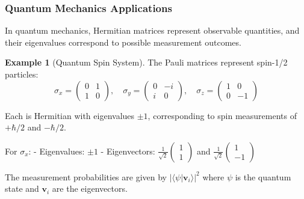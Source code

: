 \documentclass[12pt]{article}
\numberwithin{equation}{section}
\newcommand{\vect}[1]{\boldsymbol{#1}}   %
\theoremstyle{plain}
\theoremstyle{definition}
\newtheorem{example}[theorem]{Example}
\theoremstyle{remark}
\begin{document}
\subsubsection{Quantum Mechanics Applications}

In quantum mechanics, Hermitian matrices represent observable quantities, and their eigenvalues correspond to possible measurement outcomes.

\begin{example}[Quantum Spin System]
The Pauli matrices represent spin-1/2 particles:
$$\sigma_x = \begin{pmatrix} 0 & 1 \\ 1 & 0 \end{pmatrix}, \quad \sigma_y = \begin{pmatrix} 0 & -i \\ i & 0 \end{pmatrix}, \quad \sigma_z = \begin{pmatrix} 1 & 0 \\ 0 & -1 \end{pmatrix}$$

Each is Hermitian with eigenvalues $\pm 1$, corresponding to spin measurements of $+\hbar/2$ and $-\hbar/2$.

For $\sigma_x$:
- Eigenvalues: $\pm 1$
- Eigenvectors: $\frac{1}{\sqrt{2}}\begin{pmatrix} 1 \\ 1 \end{pmatrix}$ and $\frac{1}{\sqrt{2}}\begin{pmatrix} 1 \\ -1 \end{pmatrix}$

The measurement probabilities are given by $|\langle \psi | \vect{v}_i \rangle|^2$ where $\psi$ is the quantum state and $\vect{v}_i$ are the eigenvectors.
\end{example}
\end{document}
